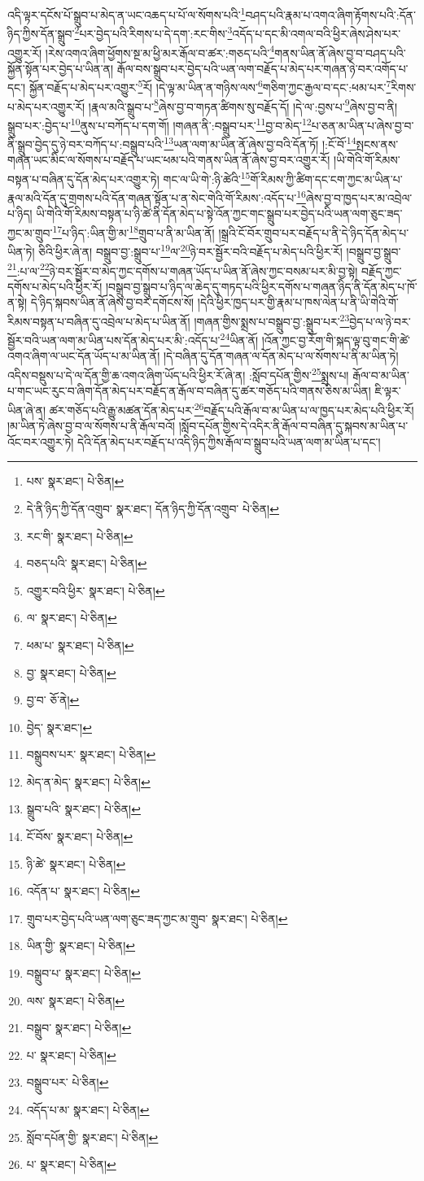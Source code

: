 འདི་ལྟར་དངོས་པོ་སྒྲུབ་པ་མེད་ན་ཡང་འཆད་པ་པོ་ལ་སོགས་པའི་\footnote{པས་  སྣར་ཐང་།  པེ་ཅིན། }བཤད་པའི་རྣམ་པ་འགའ་ཞིག་རྟོགས་པའི་:དོན་ཉིད་ཀྱིས་དོན་སྒྲུབ་\footnote{དེ་ནི་ཉིད་ཀྱི་དོན་འགྲུབ་  སྣར་ཐང་། དོན་ཉིད་ཀྱི་དོན་འགྲུབ་  པེ་ཅིན། }པར་བྱེད་པའི་རིགས་པ་དེ་དག་:རང་གིས་\footnote{རང་གི་  སྣར་ཐང་།  པེ་ཅིན། }འདོད་པ་དང་མི་འགལ་བའི་ཕྱིར་ཞེས་ཤེས་པར་འགྱུར་རོ། །རེས་འགའ་ཞིག་ཕྱོགས་སྔ་མ་ཕྱི་མར་རྒོལ་བ་ཚར་:གཅད་པའི་\footnote{བཅད་པའི་  སྣར་ཐང་།  པེ་ཅིན། }གནས་ཡིན་ནོ་ཞེས་བྱ་བ་བཤད་པའི་སྐྱོན་སྟོན་པར་བྱེད་པ་ཡིན་ན། རྒོལ་བས་སྒྲུབ་པར་བྱེད་པའི་ཡན་ལག་བརྗོད་པ་མེད་པར་གཞན་ཉེ་བར་འགོད་པ་དང་། སྐྱོན་བརྗོད་པ་མེད་པར་འགྱུར་\footnote{འགྱུར་བའི་ཕྱིར་  སྣར་ཐང་།  པེ་ཅིན། }རོ། །དེ་ལྟ་མ་ཡིན་ན་གཉིས་ལས་\footnote{ལ་  སྣར་ཐང་།  པེ་ཅིན། }གཅིག་ཀྱང་རྒྱལ་བ་དང་:ཕམ་པར་\footnote{ཕམ་པ་  སྣར་ཐང་།  པེ་ཅིན། }རིགས་པ་མེད་པར་འགྱུར་རོ། །རྣལ་མའི་སྒྲུབ་པ་\footnote{བྱ་  སྣར་ཐང་།  པེ་ཅིན། }ཞེས་བྱ་བ་གཏན་ཚིགས་སུ་བརྗོད་དོ། །དེ་ལ་:བྱས་པ་\footnote{བྱ་བ་  ཅོ་ནེ། }ཞེས་བྱ་བ་ནི། སྒྲུབ་པར་:བྱེད་པ་\footnote{བྱེད་  སྣར་ཐང་། }ནུས་པ་བཀོད་པ་དག་གོ། །གཞན་ནི་:བསྒྲུབ་པར་\footnote{བསྒྲུབས་པར་  སྣར་ཐང་།  པེ་ཅིན། }བྱ་བ་མེད་\footnote{མེད་ན་མེད་  སྣར་ཐང་།  པེ་ཅིན། }པ་ཅན་མ་ཡིན་པ་ཞེས་བྱ་བ་ནི་སྒྲུབ་བྱེད་དུ་ཉེ་བར་བཀོད་པ་:བསྒྲུབ་པའི་\footnote{སྒྲུབ་པའི་  སྣར་ཐང་།  པེ་ཅིན། }ཡན་ལག་མ་ཡིན་ནོ་ཞེས་བྱ་བའི་དོན་ཏོ། །:ངོ་བོ་\footnote{ངོ་བོས་  སྣར་ཐང་།  པེ་ཅིན། }སྤངས་ནས་གཞན་ཡང་མིང་ལ་སོགས་པ་བརྗོད་པ་ཡང་ཕམ་པའི་གནས་ཡིན་ནོ་ཞེས་བྱ་བར་འགྱུར་རོ། །ཡི་གེའི་གོ་རིམས་བསྟན་པ་བཞིན་དུ་དོན་མེད་པར་འགྱུར་ཏེ། གང་ལ་ཡི་གེ་:ཉི་ཚེའི་\footnote{ཉི་ཚེ་  སྣར་ཐང་།  པེ་ཅིན། }གོ་རིམས་ཀྱི་ཚིག་དང་ངག་ཀྱང་མ་ཡིན་པ་རྣལ་མའི་དོན་དུ་གྲགས་པའི་དོན་གཞན་སྟོན་པ་ན་སེང་གེའི་གོ་རིམས་:འདོད་པ་\footnote{འདོན་པ་  སྣར་ཐང་།  པེ་ཅིན། }ཞེས་བྱ་བ་ཁྱད་པར་མ་འབྲེལ་པ་ཉིད། ཡི་གེའི་གོ་རིམས་བསྟན་པ་ཉི་ཚེ་ནི་དོན་མེད་པ་སྟེ་འོན་ཀྱང་གང་སྒྲུབ་པར་བྱེད་པའི་ཡན་ལག་ཅུང་ཟད་ཀྱང་མ་གྲུབ་\footnote{གྲུབ་པར་བྱེད་པའི་ཡན་ལག་ཅུང་ཟད་ཀྱང་མ་གྲུབ་  སྣར་ཐང་།  པེ་ཅིན། }པ་ཉིད་:ཡིན་གྱི་མ་\footnote{ཡིན་གྱི་  སྣར་ཐང་།  པེ་ཅིན། }གྲུབ་པ་ནི་མ་ཡིན་ནོ། །སྒྲའི་ངོ་བོར་གྲུབ་པར་བརྗོད་པ་ནི་དེ་ཉིད་དོན་མེད་པ་ཡིན་ཏེ། ཅིའི་ཕྱིར་ཞེ་ན། བསྒྲུབ་བྱ་:སྒྲུབ་པ་\footnote{བསྒྲུབ་པ་  སྣར་ཐང་།  པེ་ཅིན། }ལ་\footnote{ལས་  སྣར་ཐང་།  པེ་ཅིན། }ཉེ་བར་སྦྱོར་བའི་བརྗོད་པ་མེད་པའི་ཕྱིར་རོ། །བསྒྲུབ་བྱ་སྒྲུབ་\footnote{བསྒྲུབ་  སྣར་ཐང་།  པེ་ཅིན། }:པ་ལ་\footnote{པ་  སྣར་ཐང་།  པེ་ཅིན། }ཉེ་བར་སྦྱོར་བ་མེད་ཀྱང་དགོས་པ་གཞན་ཡོད་པ་ཡིན་ནོ་ཞེས་ཀྱང་བསམ་པར་མི་བྱ་སྟེ། བརྗོད་ཀྱང་དགོས་པ་མེད་པའི་ཕྱིར་རོ། །བསྒྲུབ་བྱ་སྒྲུབ་པ་ཉིད་ལ་ཆེད་དུ་གཏད་པའི་ཕྱིར་དགོས་པ་གཞན་ཉིད་ནི་དོན་མེད་པ་ཁོ་ན་སྟེ། དེ་ཉིད་སྐབས་ཡིན་ནོ་ཞེས་བྱ་བར་དགོངས་སོ། །དེའི་ཕྱིར་ཁྱད་པར་གྱི་རྣམ་པ་ཁས་ལེན་པ་ནི་ཡི་གེའི་གོ་རིམས་བསྟན་པ་བཞིན་དུ་འབྲེལ་པ་མེད་པ་ཡིན་ནོ། །གཞན་གྱིས་སྨྲས་པ་བསྒྲུབ་བྱ་:སྒྲུབ་པར་\footnote{བསྒྲུབ་པར་  པེ་ཅིན། }བྱེད་པ་ལ་ཉེ་བར་སྦྱོར་བའི་ཡན་ལག་མ་ཡིན་པས་དོན་མེད་པར་མི་:འདོད་པ་\footnote{འདོད་པ་མ་  སྣར་ཐང་།  པེ་ཅིན། }ཡིན་ནོ། །འོན་ཀྱང་བྱ་རོག་གི་སྐད་ལྟ་བུ་གང་གི་ཚེ་འགའ་ཞིག་ལ་ཡང་དོན་ཡོད་པ་མ་ཡིན་ནོ། །དེ་བཞིན་དུ་དོན་གཞན་ལ་དོན་མེད་པ་ལ་སོགས་པ་ནི་མ་ཡིན་ཏེ། འདིས་བསྡུས་པ་དེ་ལ་དོན་གྱི་ཆ་འགའ་ཞིག་ཡོད་པའི་ཕྱིར་རོ་ཞེ་ན། :སློབ་དཔོན་གྱིས་\footnote{སློབ་དཔོན་གྱི་  སྣར་ཐང་།  པེ་ཅིན། }སྨྲས་པ། རྒོལ་བ་མ་ཡིན་པ་གང་ཡང་རུང་བ་ཞིག་དོན་མེད་པར་བརྗོད་ན་རྒོལ་བ་བཞིན་དུ་ཚར་གཅོད་པའི་གནས་ཅིས་མ་ཡིན། ཇི་ལྟར་ཡིན་ཞེ་ན། ཚར་གཅོད་པའི་རྒྱུ་མཚན་དོན་མེད་པར་\footnote{པ་  སྣར་ཐང་།  པེ་ཅིན། }བརྗོད་པའི་རྒོལ་བ་མ་ཡིན་པ་ལ་ཁྱད་པར་མེད་པའི་ཕྱིར་རོ། །མ་ཡིན་ཏེ་ཞེས་བྱ་བ་ལ་སོགས་པ་ནི་རྒོལ་བའོ། །སློབ་དཔོན་གྱིས་དེ་འདིར་ནི་རྒོལ་བ་བཞིན་དུ་སྐབས་མ་ཡིན་པ་འོང་བར་འགྱུར་ཏེ། དེའི་དོན་མེད་པར་བརྗོད་པ་འདི་ཉིད་ཀྱིས་རྒོལ་བ་སྒྲུབ་པའི་ཡན་ལག་མ་ཡིན་པ་དང་། 